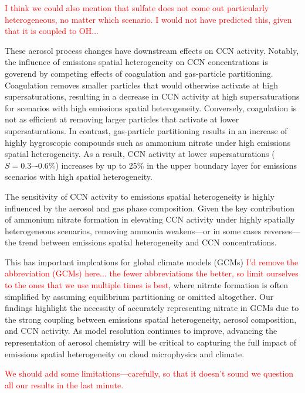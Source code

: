 \documentclass[journal abbreviation, manuscript]{copernicus}
\begin{document}
\textcolor{red}{I think we could also mention that sulfate does not
  come out particularly heterogeneous, no matter which scenario. I
  would not have predicted this, given that it is coupled to OH...}

These aerosol process changes have downstream effects on CCN
activity. Notably, the influence of emissions spatial heterogeneity on
CCN concentrations is goverend by competing effects of coagulation and
gas-particle partitioning. Coagulation removes smaller particles that
would otherwise activate at high supersaturations, resulting in a
decrease in CCN activity at high supersaturations for scenarios with
high emissions spatial heterogeneity. Conversely, coagulation is not
as efficient at removing larger particles that activate at lower
supersaturations. In contrast, gas-particle partitioning results in an
increase of highly hygroscopic compounds such as ammonium nitrate
under high emissions spatial heterogeneity. As a result, CCN activity
at lower supersaturations ($S = 0.3\mbox{–-}0.6\%$) increases by up to
25\% in the upper boundary layer for emissions scenarios with high
spatial heterogeneity.

The sensitivity of CCN activity to emissions spatial heterogeneity is highly
influenced by the aerosol and gas phase composition. Given the key
contribution of ammonium nitrate formation in elevating CCN activity
under highly spatially heterogeneous scenarios, removing ammonia
weakens---or in some cases reverses---the trend between emissions
spatial heterogeneity and CCN concentrations.

This has important implcations for global climate models (GCMs)
\textcolor{red}{I'd remove the abbreviation (GCMs) here... the fewer
  abbreviations the better, so limit ourselves to the ones that we use
  multiple times is best}, where nitrate formation is often simplified
by assuming equilibrium partitioning or omitted altogether. Our
findings highlight the necessity of accurately representing nitrate in
GCMs due to the strong coupling between emissions spatial
heterogeneity, aerosol composition, and CCN activity. As model
resolution continues to improve, advancing the representation of
aerosol chemistry will be critical to capturing the full impact of
emissions spatial heterogeneity on cloud microphysics and climate.

\textcolor{red}{We should add some limitations---carefully, so that it
  doesn't sound we question all our results in the last minute.}

\end{document}
